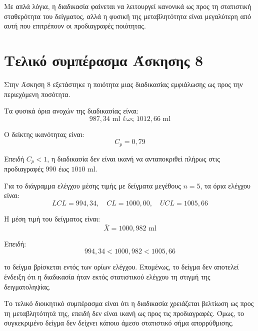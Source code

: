 \documentclass[12pt,a4paper]{article}
\begin{document}
Με απλά λόγια, η διαδικασία φαίνεται να λειτουργεί κανονικά ως προς τη στατιστική σταθερότητα του δείγματος, αλλά η φυσική της μεταβλητότητα είναι μεγαλύτερη από αυτή που επιτρέπουν οι προδιαγραφές ποιότητας.

\section{Τελικό συμπέρασμα Άσκησης 8}

Στην Άσκηση 8 εξετάστηκε η ποιότητα μιας διαδικασίας εμφιάλωσης ως προς την περιεχόμενη ποσότητα.

Τα φυσικά όρια ανοχών της διαδικασίας είναι:
\[
\boxed{987{,}34 \text{ ml έως } 1012{,}66 \text{ ml}}
\]

Ο δείκτης ικανότητας είναι:
\[
\boxed{C_p=0{,}79}
\]

Επειδή \(C_p<1\), η διαδικασία δεν είναι ικανή να ανταποκριθεί πλήρως στις προδιαγραφές \(990\) έως \(1010\) ml.

Για το διάγραμμα ελέγχου μέσης τιμής με δείγματα μεγέθους \(n=5\), τα όρια ελέγχου είναι:
\[
\boxed{LCL=994{,}34,\quad CL=1000{,}00,\quad UCL=1005{,}66}
\]

Η μέση τιμή του δείγματος είναι:
\[
\boxed{\bar{X}=1000{,}982 \text{ ml}}
\]

Επειδή:
\[
994{,}34<1000{,}982<1005{,}66
\]

το δείγμα βρίσκεται εντός των ορίων ελέγχου. Επομένως, το δείγμα δεν αποτελεί ένδειξη ότι η διαδικασία ήταν εκτός στατιστικού ελέγχου τη στιγμή της δειγματοληψίας.

Το τελικό διοικητικό συμπέρασμα είναι ότι η διαδικασία χρειάζεται βελτίωση ως προς τη μεταβλητότητά της, επειδή δεν είναι ικανή ως προς τις προδιαγραφές. Όμως, το συγκεκριμένο δείγμα δεν δείχνει κάποιο άμεσο στατιστικό σήμα απορρύθμισης.
\end{document}

